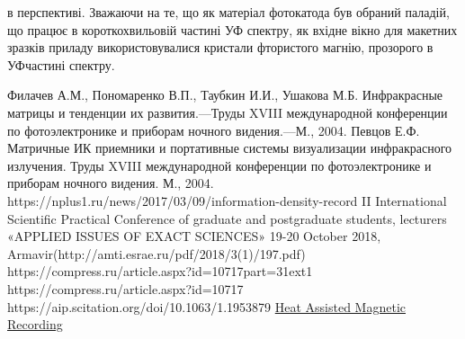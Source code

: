 \documentclass[a4paper,14pt]{extreport}
\begin{document}
в перспективі. Зважаючи на те, що як матеріал фотокатода
був обраний паладій, що працює в короткохвильовій частині УФ спектру, як вхідне вікно для макетних зразків приладу
використовувалися кристали фтористого магнію, прозорого в УФчастині спектру.






















\begin{thebibliography}{9}
 Филачев А.М., Пономаренко В.П., Таубкин И.И., Ушакова М.Б.
Инфракрасные матрицы и тенденции их развития.—Труды XVIII международной конференции по фотоэлектронике и приборам ночного видения.—М., 2004.
 Певцов Е.Ф. Матричные ИК приемники и портативные системы
визуализации инфракрасного излучения. Труды XVIII международной конференции по фотоэлектронике и приборам ночного видения. М., 2004.
 https://nplus1.ru/news/2017/03/09/information-density-record
 II International Scientific Practical Conference of graduate and postgraduate students,
lecturers «APPLIED ISSUES OF EXACT SCIENCES»
19-20 October 2018, Armavir(http://amti.esrae.ru/pdf/2018/3(1)/197.pdf)
 https://compress.ru/article.aspx?id=10717part=31ext1
 https://compress.ru/article.aspx?id=10717
 https://aip.scitation.org/doi/10.1063/1.1953879
 \href{https://www.researchgate.net/publication/224354512_Heat_Assisted_Magnetic_Recording}{Heat Assisted Magnetic Recording}
\end{thebibliography}
\end{document}
